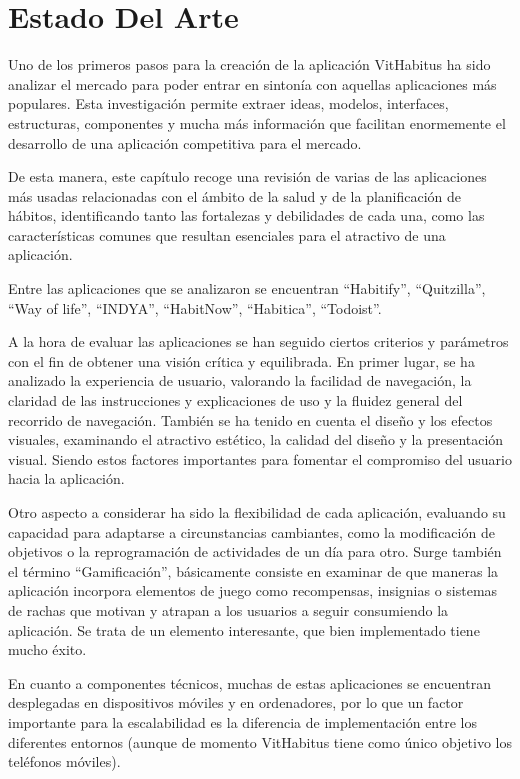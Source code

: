 \chapter{Estado Del Arte}
\label{cap:estadoArte}

Uno de los primeros pasos para la creación de la aplicación VitHabitus ha sido analizar el mercado para poder entrar en sintonía con aquellas aplicaciones más populares. Esta investigación permite extraer ideas, modelos, interfaces, estructuras, componentes y mucha más información que facilitan enormemente el desarrollo de una aplicación competitiva para el mercado.

De esta manera, este capítulo recoge una revisión de varias de las aplicaciones más usadas relacionadas con el ámbito de la salud y de la planificación de hábitos, identificando tanto las fortalezas y debilidades de cada una, como las  características comunes que resultan esenciales para el atractivo de una aplicación.

Entre las aplicaciones que se analizaron se encuentran ``Habitify'', ``Quitzilla'', ``Way of life'', ``INDYA'', ``HabitNow'', ``Habitica'', ``Todoist''. 

A la hora de evaluar las aplicaciones se han seguido ciertos criterios y parámetros con el fin de obtener una visión crítica y equilibrada. En primer lugar, se ha analizado la experiencia de usuario, valorando la facilidad de navegación, la claridad de las instrucciones y explicaciones de uso y la fluidez general del recorrido de navegación. También se ha tenido en cuenta el diseño y los efectos visuales, examinando el atractivo estético, la calidad del diseño y la presentación visual. Siendo estos factores importantes para fomentar el compromiso del usuario hacia la aplicación.

Otro aspecto a considerar ha sido la flexibilidad de cada aplicación, evaluando su capacidad para adaptarse a circunstancias cambiantes, como la modificación de objetivos o la reprogramación de actividades de un día para otro. Surge también el término ``Gamificación'', básicamente consiste en examinar de que maneras la aplicación incorpora elementos de juego como recompensas, insignias o sistemas de rachas que motivan y atrapan a los usuarios a seguir consumiendo la aplicación. Se trata de un elemento interesante, que bien implementado tiene mucho éxito. 

En cuanto a componentes técnicos, muchas de estas aplicaciones se encuentran desplegadas en dispositivos móviles y en ordenadores, por lo que un factor importante para la escalabilidad es la diferencia de implementación entre los diferentes entornos (aunque de momento VitHabitus tiene como único objetivo los teléfonos móviles). 

